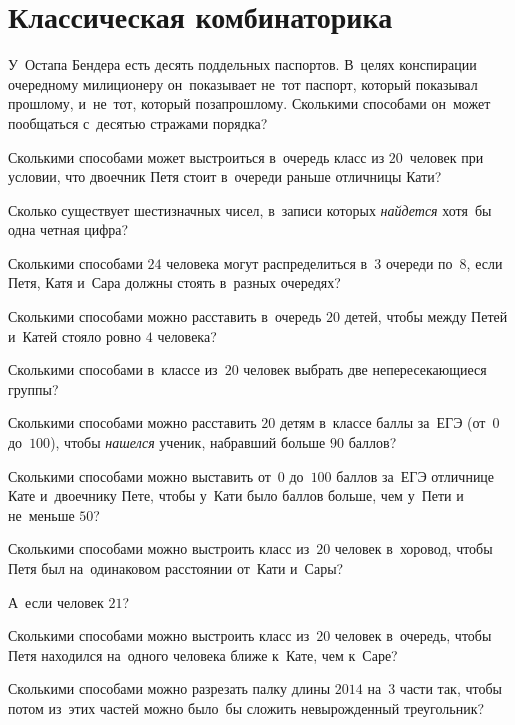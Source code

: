 
\section*{Классическая комбинаторика}


\begin{problems}

\item
У~Остапа Бендера есть десять поддельных паспортов.
В~целях конспирации очередному милиционеру он~показывает не~тот паспорт,
который показывал прошлому, и~не~тот, который позапрошлому.
Сколькими способами он~может пообщаться с~десятью стражами порядка?

\item
Сколькими способами может выстроиться в~очередь класс из $20$~человек при
условии, что двоечник Петя стоит в~очереди раньше отличницы Кати?

\item
Сколько существует шестизначных чисел, в~записи которых \emph{найдется}
хотя~бы одна четная цифра?

\item
Сколькими способами $24$ человека могут распределиться в~$3$ очереди по~$8$,
если Петя, Катя и~Сара должны стоять в~разных очередях?

\item
Сколькими способами можно расставить в~очередь $20$ детей, чтобы между Петей
и~Катей стояло ровно $4$ человека?

\item
Сколькими способами в~классе из~$20$ человек выбрать две непересекающиеся
группы?

\item
Сколькими способами можно расставить $20$ детям в~классе баллы за~ЕГЭ
(от~$0$ до~$100$), чтобы \emph{нашелся} ученик, набравший больше $90$ баллов?

\item
Сколькими способами можно выставить от~$0$ до~$100$ баллов за~ЕГЭ отличнице
Кате и~двоечнику Пете, чтобы у~Кати было баллов больше, чем у~Пети и
не~меньше $50$?

\item
Сколькими способами можно выстроить класс из~$20$ человек в~хоровод, чтобы Петя
был на~одинаковом расстоянии от~Кати и~Сары?

\item
А~если человек $21$?

\item
Сколькими способами можно выстроить класс из~$20$ человек в~очередь, чтобы Петя
находился на~одного человека ближе к~Кате, чем к~Саре?

\item
Сколькими способами можно разрезать палку длины $2014$ на~$3$ части так, чтобы
потом из~этих частей можно было~бы сложить невырожденный треугольник?

\end{problems}

